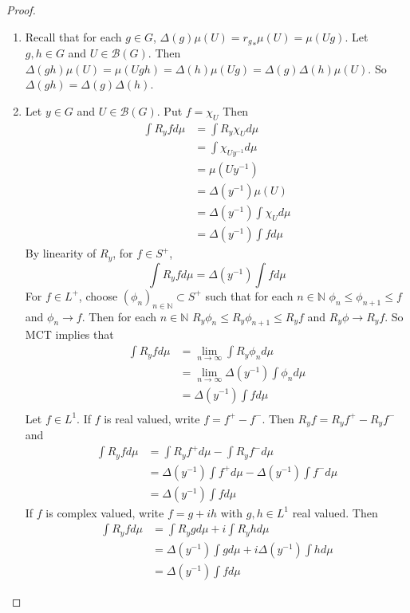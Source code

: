 \documentclass[12pt]{amsart}
\newcommand{\Del}{\Delta}
\newcommand{\N}{\mathbb{N}}
\newcommand{\MB}{\mathcal{B}}
\newcommand{\limn}{\lim \limits_{n \rightarrow \infty}}
\newcommand{\seq}[2]{(#1_{#2})_{#2 \in \N}}
\begin{document}
	\begin{proof}\
		\begin{enumerate}
			\item Recall that for each $g \in G$, $\Del(g)\mu(U) = {r_g}_*\mu(U) = \mu(Ug)$. Let $g, h \in G$ and $U \in \MB(G)$. Then $\Del(gh)\mu(U) = \mu(Ugh) = \Del(h)\mu(Ug) = \Del(g) \Del(h)\mu(U)$. So $\Del(gh) = \Del(g) \Del(h)$.
			\item Let $y \in G$ and $U \in \MB(G)$. Put $f = \chi_U$ Then 
			\begin{align*}
				\int R_y f d \mu 
				& = \int R_y \chi_U d \mu \\
				& = \int \chi_{Uy^{-1}} d \mu \\
				& = \mu(Uy^{-1}) \\
				& = \Del(y^{-1}) \mu(U) \\
				& = \Del(y^{-1})  \int \chi_U d \mu \\
				&= \Del(y^{-1})  \int f d \mu
			\end{align*}
			By linearity of $R_y$, for $f \in S^+$, $$\int R_y f d \mu = \Del(y^{-1}) \int f d \mu$$
			For $f \in L^+$, choose $\seq{\phi}{n} \subset S^+$ such that for each $n \in \N$ $\phi_n \leq \phi_{n+1} \leq f$ and $\phi_n \rightarrow f$. Then for each $n \in \N$ $R_y \phi_n \leq R_y \phi_{n+1} \leq R_y f$ and $R_y \phi \rightarrow R_y f$. So MCT implies that 
			\begin{align*}
				\int R_y f d \mu 
				& = \limn \int R_y \phi_n d \mu \\
				& = \limn \Del(y^{-1}) \int \phi_n d \mu \\
				& = \Del(y^{-1}) \int f d \mu \\
			\end{align*}
			Let $f \in L^1$. If $f$ is real valued, write $f = f^+ - f^-$. Then $R_y f = R_y f^+ - R_y f^-$ and 
			\begin{align*}
				\int R_yf d \mu 
				& = \int R_y f^+ d \mu - \int R_y f^- d \mu \\
				& = \Del(y^{-1}) \int f^+ d \mu - \Del(y^{-1}) \int f^- d \mu \\
				& = \Del(y^{-1}) \int f d \mu
			\end{align*}
			If $f$ is complex valued, write $f = g + ih$ with $g, h \in L^1$ real valued. Then 
			\begin{align*}
				\int R_yf d \mu 
				& = \int R_y g d \mu + i \int R_y h d \mu \\
				& = \Del(y^{-1}) \int g d \mu +i \Del(y^{-1}) \int h d \mu \\
				& = \Del(y^{-1}) \int f d \mu
			\end{align*}
		\end{enumerate}
	\end{proof}
\end{document}
